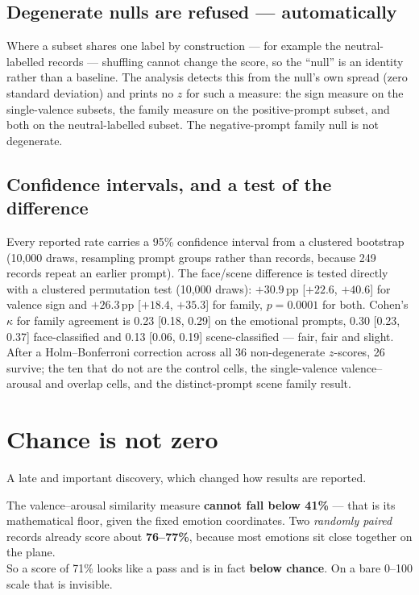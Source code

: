 \documentclass[11pt,a4paper]{article}
\begin{document}
\subsection{Degenerate nulls are refused --- automatically}

Where a subset shares one label by construction --- for example the neutral-labelled records ---
shuffling cannot change the score, so the ``null'' is an identity rather than a baseline. The
analysis detects this from the null's own spread (zero standard deviation) and prints no $z$ for such
a measure: the sign measure on the single-valence subsets, the family measure on the positive-prompt
subset, and both on the neutral-labelled subset. The negative-prompt family null is not degenerate.

\subsection{Confidence intervals, and a test of the difference}

Every reported rate carries a 95\% confidence interval from a clustered bootstrap (10{,}000 draws,
resampling prompt groups rather than records, because 249 records repeat an earlier prompt). The
face/scene difference is tested directly with a clustered permutation test (10{,}000 draws):
$+30.9$\,pp [$+22.6$, $+40.6$] for valence sign and $+26.3$\,pp [$+18.4$, $+35.3$] for family,
$p = 0.0001$ for both. Cohen's $\kappa$ for family agreement is 0.23 [0.18, 0.29] on the emotional
prompts, 0.30 [0.23, 0.37] face-classified and 0.13 [0.06, 0.19] scene-classified --- fair, fair and
slight. After a Holm--Bonferroni correction across all 36 non-degenerate $z$-scores, 26 survive; the
ten that do not are the control cells, the single-valence valence--arousal and overlap cells, and the
distinct-prompt scene family result.

\section{Chance is not zero}

A late and important discovery, which changed how results are reported.

\begin{key}
The valence--arousal similarity measure \textbf{cannot fall below 41\%} --- that is its mathematical
floor, given the fixed emotion coordinates. Two \emph{randomly paired} records already score about
\textbf{76--77\%}, because most emotions sit close together on the plane.\\[6pt]
So a score of 71\% looks like a pass and is in fact \textbf{below chance}. On a bare 0--100 scale
that is invisible.
\end{key}
\end{document}
